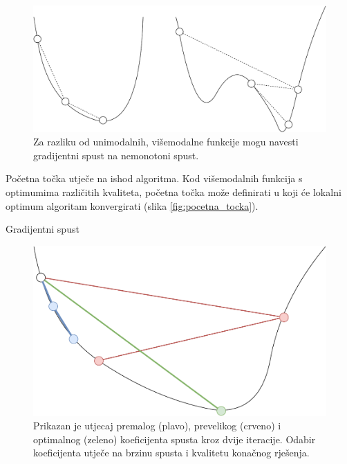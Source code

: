 \documentclass[times, utf8, numeric, diplomski]{fer}
\def\figref#1{(slika \ref{#1})}
\begin{document}
\begin{figure}[H]
\centering
\includegraphics[scale=0.45]{grad_descent_modality.pdf}
\caption{Za razliku od unimodalnih, višemodalne funkcije mogu navesti gradijentni spust na nemonotoni spust.}
\label{fig:gradientni_spust}
\end{figure}

Početna točka utječe na ishod algoritma. Kod višemodalnih funkcija s optimumima različitih kvaliteta, početna točka može definirati u koji će lokalni optimum algoritam konvergirati \figref{fig:pocetna_tocka}.
\newline
\newline
\begin{algorithm}[H]
\DontPrintSemicolon
{}
\;
\caption{Gradijentni spust}
\label{alg:grad_spust}
\end{algorithm}

\begin{figure}[H]
\centering
\includegraphics[scale=0.4]{grad_descent_rate.pdf}
\caption{Prikazan je utjecaj premalog (plavo), prevelikog (crveno) i optimalnog (zeleno) koeficijenta spusta kroz dvije iteracije. Odabir koeficijenta utječe na brzinu spusta i kvalitetu konačnog rješenja.}
\label{fig:oscilira_divergira}
\end{figure}
\end{document}
